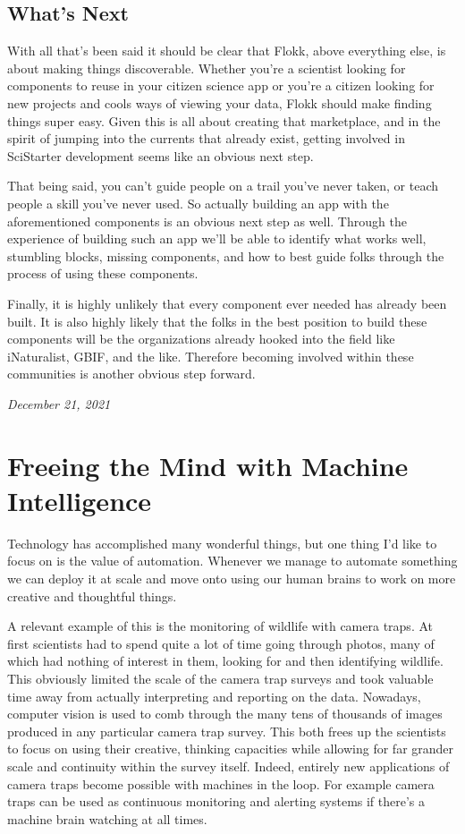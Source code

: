 \documentclass[10pt,a5paper]{book}
\begin{document}
\subsection{What's Next}
With all that's been said it should be clear that Flokk, above everything else, is about making things discoverable. Whether you're a scientist looking for components to reuse in your citizen science app or you're a citizen looking for new projects and cools ways of viewing your data, Flokk should make finding things super easy. Given this is all about creating that marketplace, and in the spirit of jumping into the currents that already exist, getting involved in SciStarter development seems like an obvious next step. 

That being said, you can't guide people on a trail you've never taken, or teach people a skill you've never used. So actually building an app with the aforementioned components is an  obvious next step as well. Through the experience of building such an app we'll be able to identify what works well, stumbling blocks, missing components, and how to best guide folks through the process of using these components.  

Finally, it is highly unlikely that every component ever needed has already been built. It is also highly likely that the folks in the best position to build these components will be the organizations already hooked into the field like iNaturalist, GBIF, and the like. Therefore becoming involved within these communities is another obvious step forward. 

\textit{December 21, 2021}

\section{Freeing the Mind with Machine Intelligence}
Technology has accomplished many wonderful things, but one thing I'd like to focus on is the value of automation. Whenever we manage to automate something we can deploy it at scale and move onto using our human brains to work on more creative and thoughtful things.

A relevant example of this is the monitoring of wildlife with camera traps. At first scientists had to spend quite a lot of time going through photos, many of which had nothing of interest in them, looking for and then identifying wildlife. This obviously limited the scale of the camera trap surveys and took valuable time away from actually interpreting and reporting on the data. Nowadays, computer vision is used to comb through the many tens of thousands of images produced in any particular camera trap survey. This both frees up the scientists to focus on using their creative, thinking capacities while allowing for far grander scale and continuity within the survey itself. Indeed, entirely new applications of camera traps become possible with machines in the loop. For example camera traps can be used as continuous monitoring and alerting systems if there's a machine brain watching at all times. 
\end{document}
